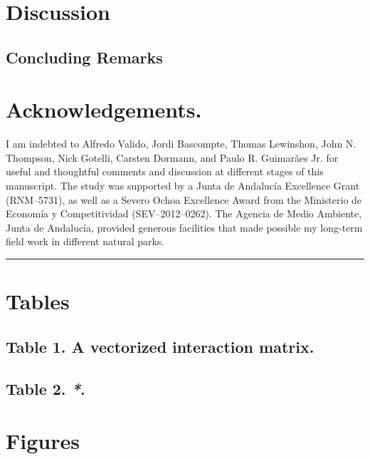 \documentclass[a4paper,12pt]{article}
\begin{document}
\begin{spacing}{1.0}
\chapter{Discussion}
\label{discussion}

\section{Concluding Remarks}
\label{concludingremarks}

\chapter{\textbf{Acknowledgements}.}
\label{acknowledgements.}

I am indebted to Alfredo Valido, Jordi Bascompte, Thomas Lewinshon, John N. Thompson, Nick Gotelli, Carsten Dormann, and Paulo R. Guimarães Jr. for useful and thoughtful comments and discussion at different stages of this manuscript. The study was supported by a Junta de Andalucía Excellence Grant (RNM--5731), as well as a Severo Ochoa Excellence Award from the Ministerio de Economía y Competitividad (SEV--2012--0262). The Agencia de Medio Ambiente, Junta de Andalucía, provided generous facilities that made possible my long-term field work in different natural parks.

\begin{center}\rule{3in}{0.4pt}\end{center}


\chapter{Tables}
\label{tables}

\section{Table 1. A vectorized interaction matrix.}
\label{table1.avectorizedinteractionmatrix.}

\section{Table 2. \emph{*}.}
\label{table2..}

\chapter{Figures}
\label{figures}


\end{spacing}
\end{document}

